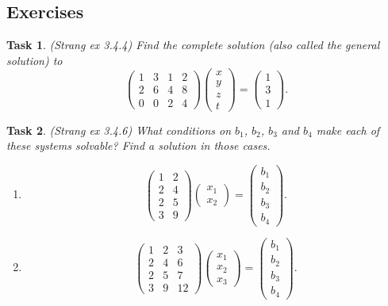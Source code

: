 \documentclass[10pt,]{book}
\theoremstyle{plain}
\numberwithin{equation}{section}
\newtheorem{task}{Task}[chapter]
\begin{document}
\subsection[Exercises]{Exercises}\label{subsection-77}
\begin{task}
\label{task-100}
(Strang ex 3.4.4)
        Find the complete solution (also called the general solution) to
        \[
          \begin{pmatrix} 1 & 3 & 1 & 2 \\
          2 & 6 & 4 & 8 \\
          0 & 0 & 2 & 4 \end{pmatrix}
          \begin{pmatrix} x \\ y \\ z \\ t \end{pmatrix} =
          \begin{pmatrix} 1 \\ 3 \\ 1 \end{pmatrix}.
        \]\end{task}
\begin{task}
\label{task-101}
(Strang ex 3.4.6)
        What conditions on \(b_1\), \(b_2\), \(b_3\) and \(b_4\) make
        each of these systems solvable? Find a solution in those cases.
        \begin{enumerate}
\item{}
            \[
              \begin{pmatrix} 1 & 2 \\ 2 & 4 \\ 2 & 5 \\ 3 & 9 \end{pmatrix}
              \begin{pmatrix} x_1 \\ x_2 \end{pmatrix} =
              \begin{pmatrix} b_1 \\ b_2 \\ b_3 \\ b_4 \end{pmatrix}.
            \]
          \item{}
            \[
              \begin{pmatrix} 1 & 2 & 3\\ 2 & 4 & 6\\
              2 & 5 & 7\\ 3 & 9 & 12\end{pmatrix}
              \begin{pmatrix} x_1 \\ x_2 \\ x_3\end{pmatrix} =
              \begin{pmatrix} b_1 \\ b_2 \\ b_3 \\ b_4 \end{pmatrix}.
            \]
          \end{enumerate}
\end{task}
\end{document}
